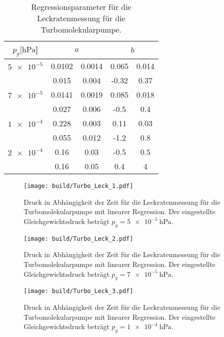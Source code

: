 \begin{table}[H]
    \centering
      \caption{Regressionsparameter für die Leckratenmessung für die Turbomolekularpumpe.}
      \label{tab:Turbo_Leck_para}
      \begin{tabular}{c c @{${}\pm{}$} c c @{${}\pm{}$} c}
        \toprule
        {$p_g [\si{\hecto\pascal}$]} & \multicolumn{2}{c}{$a$} & \multicolumn{2}{c}{$b$} \\
        \midrule
        $\num{5e-5}$  & 0.0102 & 0.0014 & 0.065 & 0.014\\
                      & 0.015  & 0.004  & -0.32 & 0.37 \\
        \midrule
        $\num{7e-5}$  & 0.0141 & 0.0019 & 0.085 & 0.018\\
                      & 0.027  & 0.006  & -0.5  & 0.4  \\
        \midrule
        $\num{1e-4}$  & 0.228  & 0.003  & 0.11  & 0.03 \\
                      & 0.055  & 0.012  & -1.2  & 0.8  \\
        \midrule
        $\num{2e-4}$  & 0.16   & 0.03   & -0.5  & 0.5  \\
                      & 0.16   & 0.05   & 0.4   & 4    \\
        \bottomrule
      \end{tabular}
\end{table}
\begin{figure}[H]
    \centering
    \texttt{[image: build/Turbo\_Leck\_1.pdf]}
    \caption{Druck in Abhängigkeit der Zeit für die Leckratenmessung für die Turbomolekularpumpe mit linearer Regression. Der eingestellte Gleichgewichtsdruck beträgt $p_g=\SI{5e-5}{\hecto\pascal}$.}
    \label{fig:turbo_leck1}
\end{figure}
\noindent
\begin{figure}[H]
    \centering
    \texttt{[image: build/Turbo\_Leck\_2.pdf]}
    \caption{Druck in Abhängigkeit der Zeit für die Leckratenmessung für die Turbomolekularpumpe mit linearer Regression. Der eingestellte Gleichgewichtsdruck beträgt $p_g=\SI{7e-5}{\hecto\pascal}$.}
    \label{fig:turbo_leck2}
\end{figure}
\noindent
\begin{figure}[H]
    \centering
    \texttt{[image: build/Turbo\_Leck\_3.pdf]}
    \caption{Druck in Abhängigkeit der Zeit für die Leckratenmessung für die Turbomolekularpumpe mit linearer Regression. Der eingestellte Gleichgewichtsdruck beträgt $p_g=\SI{1e-4}{\hecto\pascal}$.}
    \label{fig:turbo_leck3}
\end{figure}
